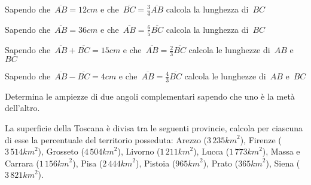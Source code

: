 \begin{multicols}{2}
 \begin{esercizio}
 \label{ese:3.99}
Sapendo che~$\overline{AB}=12\unit{cm}$ e che~$\overline{BC}=\frac{3}{4}
\overline{AB}$ calcola la lunghezza di~$BC$
\end{esercizio}

\begin{esercizio}
 \label{ese:3.100}
Sapendo che~$\overline{AB}=36\unit{cm}$ e che~$\overline{AB}=\frac{6}{5}
\overline{BC}$ calcola la lunghezza di~$BC$
\end{esercizio}

\begin{esercizio}
 \label{ese:3.101}
Sapendo che~$\overline{AB}+\overline{BC}=15\unit{cm}$ e che~$\overline{AB}=
\frac{2}{3}\overline{BC}$ calcola le lunghezze di~$AB$ e~$BC$
\end{esercizio}

\begin{esercizio}
 \label{ese:3.102}
Sapendo che~$\overline{AB}-\overline{BC}=4\unit{cm}$ e che~$\overline{AB}=
\frac{4}{3}\overline{BC}$ calcola le lunghezze di~$AB$ e~$BC$
\end{esercizio}

\begin{esercizio}
 \label{ese:3.103}
Determina le ampiezze di due angoli complementari sapendo che uno è la metà 
dell'altro.
\end{esercizio}

% 

\begin{esercizio}
 \label{ese:3.106}
La superficie della Toscana è divisa tra le seguenti provincie, calcola per 
ciascuna di esse la percentuale del territorio posseduta: 
Arezzo ($3\,235\unit{km}^2$), Firenze ($3\,514\unit{km}^2$),
Grosseto ($4\,504\unit{km}^2$), Livorno ($1\,211\unit{km}^2$), 
Lucca ($1\,773\unit{km}^2$), Massa e Carrara ($1\,156\unit{km}^2$), 
Pisa ($2\,444\unit{km}^2$), Pistoia ($965\unit{km}^2$),
Prato ($365\unit{km}^2$), Siena ($3\,821\unit{km}^2$).
\end{esercizio}


\end{multicols}
